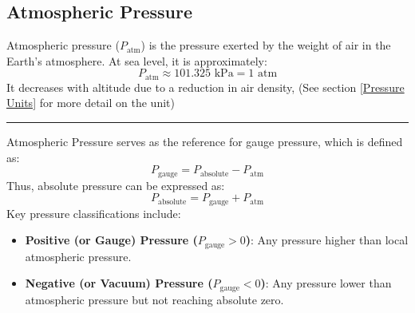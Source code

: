 \documentclass{article}
\begin{document}
\subsection{Atmospheric Pressure}
Atmospheric pressure ($P_{\text{atm}}$) is the pressure exerted by the weight of air in the Earth's atmosphere. At sea level, it is approximately:
\begin{equation*}
	P_{\text{atm}} \approx 101.325 \text{ kPa} = 1 \text{ atm}
\end{equation*}
It decreases with altitude due to a reduction in air density, (See section \ref{Pressure Units} for more detail on the unit)\\[-1em]
\vspace{0.7em}\hrule\vspace{0.7em}\noindent
Atmospheric Pressure serves as the reference for gauge pressure, which is defined as:
\begin{equation}
	P_{\text{gauge}} = P_{\text{absolute}} - P_{\text{atm}}
\end{equation}
Thus, absolute pressure can be expressed as:
\begin{equation}
	P_{\text{absolute}} = P_{\text{gauge}} + P_{\text{atm}}
	\label{eq:absolute}
\end{equation}
Key pressure classifications include:\\
\vspace{-1em}
\begin{itemize}
	\item \textbf{Positive (or Gauge) Pressure ($P_{\text{gauge}} > 0$)}: Any pressure higher than local atmospheric pressure.
	\item \textbf{Negative (or Vacuum) Pressure ($P_{\text{gauge}} < 0$)}: Any pressure lower than atmospheric pressure but not reaching absolute zero.
\end{itemize}
\end{document}
